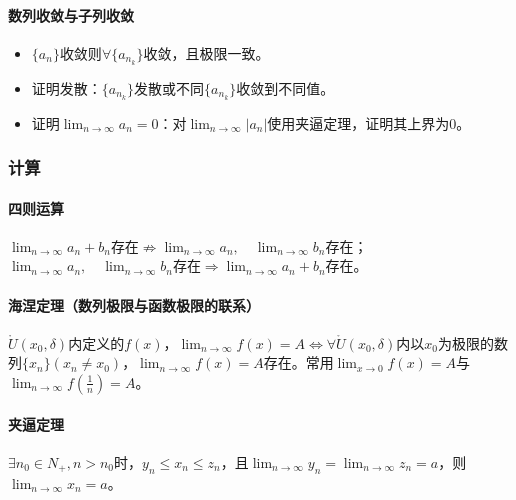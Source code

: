 \documentclass[
12pt, %
a4paper, 
oneside, %
]{scrartcl}
\begin{document}
\paragraph{数列收敛与子列收敛}
\begin{itemize}
\item $ \{a_n\} $收敛则$ \forall \{a_{n_k}\} $收敛，且极限一致。
\item 证明发散：$ \{a_{n_k}\} $发散或不同$ \{a_{n_k}\} $收敛到不同值。
\item 证明$ \lim_{n \to \infty} a_n = 0 $：对$ \lim_{n \to \infty} |a_n| $使用夹逼定理，证明其上界为$ 0 $。
\end{itemize}
\subsubsection[计算]{计算}
\paragraph{四则运算}
$ \lim_{n \to \infty} a_n + b_n $存在$ \not\Rightarrow $$ \lim_{n \to \infty} a_n, \quad \lim_{n \to \infty} b_n $存在；$ \lim_{n \to \infty} a_n, \quad \lim_{n \to \infty} b_n $存在$ \Rightarrow $$ \lim_{n \to \infty} a_n + b_n $存在。
\paragraph{海涅定理（数列极限与函数极限的联系）}
$ \mathring{U}(x_0, \delta) $内定义的$ f(x) $，$ \lim_{n \to \infty} f(x) = A \Leftrightarrow \forall \mathring{U}(x_0, \delta) $内以$ x_0 $为极限的数列$ \{x_n\}(x_n \neq x_0) $，$ \lim_{n \to \infty} f(x) = A $存在。常用$ \lim_{x \to 0} f(x) = A $与$ \lim_{n \to \infty} f(\frac{1}{n}) = A $。
\paragraph{夹逼定理}
$ \exists n_0 \in N_+, n > n_0 $时，$ y_n \leq x_n \leq z_n $，且$ \lim_{n \to \infty} y_n = \lim_{n \to \infty} z_n = a $，则$ \lim_{n \to \infty} x_n = a $。
\end{document}
